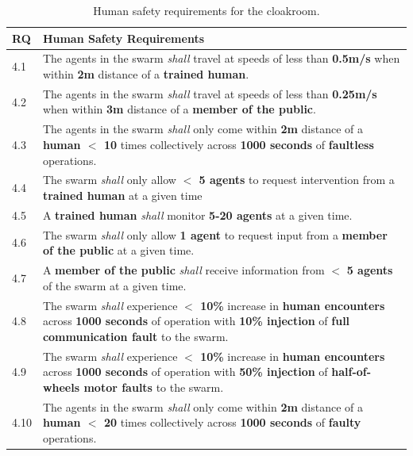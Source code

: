 \documentclass[runningheads]{llncs}
\begin{document}
\begin{table}[!h]
	\centering
	\begin{tabular}{p{6mm} p{116mm}}
		RQ & \textbf{Human Safety Requirements} \\
		\hline
		4.1 & The agents in the swarm \emph{shall} travel at speeds of less than \textbf{0.5m/s} when within \textbf{2m} distance of a \textbf{trained human}.
		\\ 
		\hline
		4.2 & The agents in the swarm \emph{shall} travel at speeds of less than \textbf{0.25m/s} when within \textbf{3m} distance of a \textbf{member of the public}.
		\\ 
		\hline
		4.3 & The agents in the swarm \emph{shall} only come within \textbf{2m} distance of a \textbf{human $<$ 10} times collectively across \textbf{1000 seconds} of \textbf{faultless} operations.
		\\ 
		\hline
		4.4 & The swarm \emph{shall} only allow \textbf{$<$ 5 agents} to request intervention from a \textbf{trained human} at a given time
		\\ 
		\hline
		4.5 & A \textbf{trained human} \emph{shall} monitor \textbf{5-20 agents} at a given time.
		\\ 
		\hline
		4.6 & The swarm \emph{shall} only allow \textbf{1 agent} to request input from a \textbf{member of the public} at a given time.
		\\ 
		\hline
		4.7 & A \textbf{member of the public} \emph{shall} receive  information from $<$ \textbf{5 agents} of the swarm at a given time.
		\\ 
		\hline
		4.8 & The swarm \emph{shall} experience \textbf{$<$ 10\%} increase in \textbf{human encounters} across \textbf{1000 seconds} of operation with \textbf{10\% injection} of \textbf{full communication fault} to the swarm. \\
		\hline
		4.9 & The swarm \emph{shall} experience \textbf{$<$ 10\%} increase in \textbf{human encounters }across \textbf{1000 seconds} of operation with \textbf{50\% injection} of \textbf{half-of-wheels motor faults} to the swarm.\\
		\hline
		4.10 & The agents in the swarm \emph{shall} only come within \textbf{2m} distance of a \textbf{human $<$ 20} times collectively across \textbf{1000 seconds} of \textbf{faulty} operations.
		\\		[1ex] 		
		\hline
	\end{tabular}
	\caption{\label{tab:human-s}Human safety requirements for the cloakroom.}
	\vspace{-4ex}
\end{table}   
\end{document}
